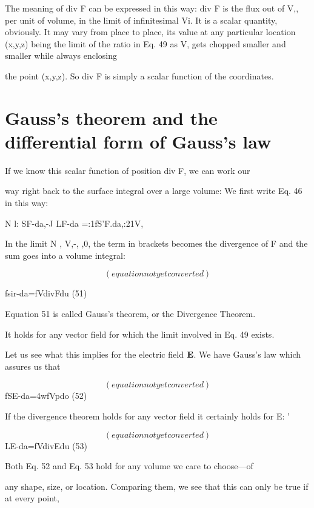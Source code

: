 The meaning of div F can be expressed in this way: div F is the
flux out of V,, per unit of volume, in the limit of infinitesimal Vi. It
is a scalar quantity, obviously. It may vary from place to place, its
value at any particular location (x,y,z) being the limit of the ratio in
Eq. 49 as V, gets chopped smaller and smaller while always enclosing

the point (x,y,z). So div F is simply a scalar function of the
coordinates.

\section{Gauss's theorem and the differential form of Gauss's law}

If we know this scalar function of position div F, we can work our

way right back to the surface integral over a large volume: We first
write Eq. 46 in this way:

N l: SF-da,-J
LF-da =:1fS'F.da,:21V,~  

In the limit N , V,-, \rightarrow,0, the term in brackets becomes the divergence
of F and the sum goes into a volume integral:

\begin{equation}
(equation not yet converted)
\end{equation}

fsir-da=fVdivFdu (51)

Equation 51 is called Gauss's theorem, or the Divergence Theorem.

It holds for any vector field for which the limit involved in Eq. 49
exists.

Let us see what this implies for the electric field $\mathbf{E}$. We have
Gauss's law which assures us that

\begin{equation}
(equation not yet converted)
\end{equation}
fSE-da=4wfVpdo (52)

If the divergence theorem holds for any vector field it certainly holds
for E: '

\begin{equation}
(equation not yet converted)
\end{equation}
LE-da=fVdivEdu (53)

Both Eq. 52 and Eq. 53 hold for any volume we care to choose---of

any shape, size, or location. Comparing them, we see that this can
only be true if at every point,

